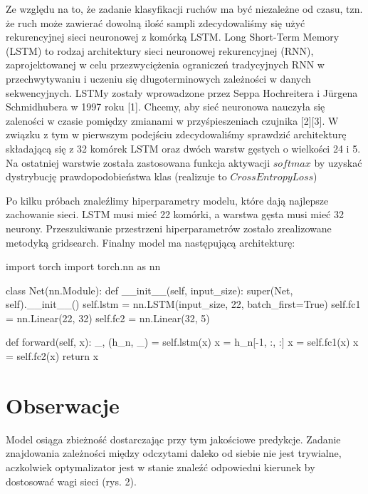 \documentclass[10pt]{article}
\begin{document}
Ze względu na to, że zadanie klasyfikacji ruchów ma być niezależne od czasu, tzn. że ruch może zawierać dowolną ilość sampli zdecydowaliśmy się użyć rekurencyjnej sieci neuronowej z komórką LSTM.
Long Short-Term Memory (LSTM) to rodzaj architektury sieci neuronowej rekurencyjnej (RNN), zaprojektowanej w celu przezwyciężenia ograniczeń tradycyjnych RNN w przechwytywaniu i uczeniu się długoterminowych zależności w danych sekwencyjnych. LSTMy zostały wprowadzone przez Seppa Hochreitera i Jürgena Schmidhubera w 1997 roku [1]. Chcemy, aby sieć neuronowa nauczyła się zaleności w czasie pomiędzy zmianami w przyśpieszeniach czujnika [2][3]. W związku z tym w pierwszym podejściu zdecydowaliśmy sprawdzić architekturę składającą się z 32 komórek LSTM oraz dwóch warstw gęstych o wielkości 24 i 5. Na ostatniej warstwie została zastosowana funkcja aktywacji $softmax$ by uzyskać dystrybucję prawdopodobieństwa klas (realizuje to $CrossEntropyLoss$)


Po kilku próbach znaleźlimy hiperparametry modelu, które dają najlepsze zachowanie sieci. LSTM musi mieć 22 komórki, a warstwa gęsta musi mieć 32 neurony. Przeszukiwanie przestrzeni hiperparametrów zostało zrealizowane metodyką gridsearch. Finalny model ma następującą architekturę:

\begin{python}
import torch
import torch.nn as nn

class Net(nn.Module):
  def __init__(self, input_size):
      super(Net, self).__init__()
      self.lstm = nn.LSTM(input_size, 22, batch_first=True)
      self.fc1 = nn.Linear(22, 32)
      self.fc2 = nn.Linear(32, 5)

  def forward(self, x):
      _, (h_n, _) = self.lstm(x)
      x = h_n[-1, :, :]
      x = self.fc1(x)
      x = self.fc2(x)
      return x
\end{python}


\section{Obserwacje}

Model osiąga zbieżność dostarczając przy tym jakościowe predykcje. Zadanie znajdowania zależności między odczytami daleko od siebie nie jest trywialne, aczkolwiek optymalizator jest w stanie znaleźć odpowiedni kierunek by dostosować wagi sieci (rys. 2).
\end{document}
